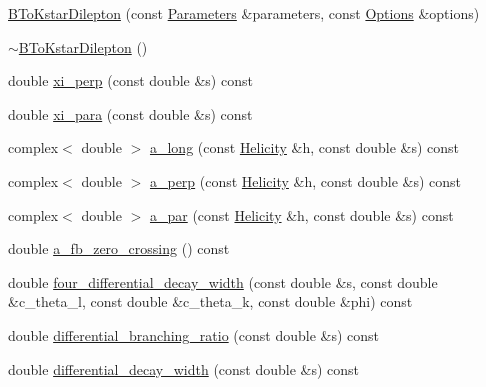 \begin{DoxyCompactItemize}
\item 
\hyperlink{classeos_1_1BToKstarDilepton_3_01LargeRecoil_01_4_ab9804a9f493c78698f013d0775e14509}{BToKstarDilepton} (const \hyperlink{classeos_1_1Parameters}{Parameters} \&parameters, const \hyperlink{classeos_1_1Options}{Options} \&options)
\item 
\hyperlink{classeos_1_1BToKstarDilepton_3_01LargeRecoil_01_4_aaa5e93714aa6fe6fa4962da519f0d2b6}{$\sim$BToKstarDilepton} ()
\item 
double \hyperlink{classeos_1_1BToKstarDilepton_3_01LargeRecoil_01_4_adda7df580794e776e15a5cef3c3b08f2}{xi\_\-perp} (const double \&s) const 
\item 
double \hyperlink{classeos_1_1BToKstarDilepton_3_01LargeRecoil_01_4_aafe87996e1cd2a71ede48a745683a4a8}{xi\_\-para} (const double \&s) const 
\item 
complex$<$ double $>$ \hyperlink{classeos_1_1BToKstarDilepton_3_01LargeRecoil_01_4_ac7dceafd65b31380d2a1e6009e6d6202}{a\_\-long} (const \hyperlink{namespaceeos_a4b2f8b0a4184d635cfc47c4ee234aea5}{Helicity} \&h, const double \&s) const 
\item 
complex$<$ double $>$ \hyperlink{classeos_1_1BToKstarDilepton_3_01LargeRecoil_01_4_a0d7d954b551e4aeb7e4ed7a77df69910}{a\_\-perp} (const \hyperlink{namespaceeos_a4b2f8b0a4184d635cfc47c4ee234aea5}{Helicity} \&h, const double \&s) const 
\item 
complex$<$ double $>$ \hyperlink{classeos_1_1BToKstarDilepton_3_01LargeRecoil_01_4_a5189131b39ddfac57b129af1bee7374c}{a\_\-par} (const \hyperlink{namespaceeos_a4b2f8b0a4184d635cfc47c4ee234aea5}{Helicity} \&h, const double \&s) const 
\item 
double \hyperlink{classeos_1_1BToKstarDilepton_3_01LargeRecoil_01_4_a2dfa00f4a78916bc1206467e50cbba84}{a\_\-fb\_\-zero\_\-crossing} () const 
\item 
double \hyperlink{classeos_1_1BToKstarDilepton_3_01LargeRecoil_01_4_add07c0155502f992a11d641b3389e777}{four\_\-differential\_\-decay\_\-width} (const double \&s, const double \&c\_\-theta\_\-l, const double \&c\_\-theta\_\-k, const double \&phi) const 
\item 
double \hyperlink{classeos_1_1BToKstarDilepton_3_01LargeRecoil_01_4_ac39adcdd23870737c98131ce116dfa74}{differential\_\-branching\_\-ratio} (const double \&s) const 
\item 
double \hyperlink{classeos_1_1BToKstarDilepton_3_01LargeRecoil_01_4_af7497c0bf4a231808b9441030d01613a}{differential\_\-decay\_\-width} (const double \&s) const 

\end{DoxyCompactItemize}
